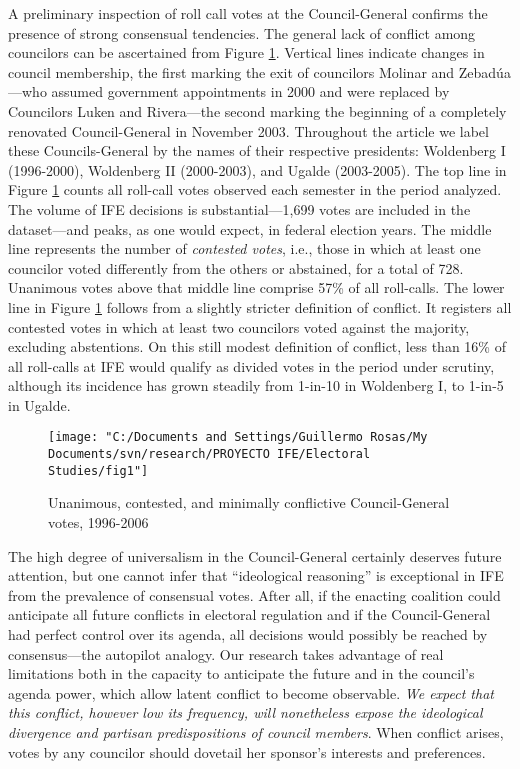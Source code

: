 \documentclass[12 pt, letter]{article}
\begin{document}
A preliminary inspection of roll call votes at the Council-General
confirms the presence of strong consensual tendencies.  The general
lack of conflict among councilors can be ascertained from Figure
\ref{F:unan}.  Vertical lines indicate changes in council
membership, the first marking the exit of councilors Molinar and
Zebad\'ua---who assumed government appointments in 2000 and were
replaced by Councilors Luken and Rivera---the second marking the
beginning of a completely renovated Council-General in November
2003.  Throughout the article we label these Councils-General by the
names of their respective presidents: Woldenberg I (1996-2000),
Woldenberg II (2000-2003), and Ugalde (2003-2005).  The top line in
Figure \ref{F:unan} counts all roll-call votes observed each
semester in the period analyzed.  The volume of IFE decisions is
substantial---1,699 votes are included in the dataset---and peaks,
as one would expect, in federal election years.  The middle line
represents the number of \emph{contested votes}, i.e., those in
which at least one councilor voted differently from the others or
abstained, for a total of 728.  Unanimous votes above that middle
line comprise 57\% of all roll-calls. The lower line in Figure
\ref{F:unan} follows from a slightly stricter definition of
conflict.  It registers all contested votes in which at least two
councilors voted against the majority, excluding abstentions.  On
this still modest definition of conflict, less than 16\% of all
roll-calls at IFE would qualify as divided votes in the period under
scrutiny, although its incidence has grown steadily from 1-in-10 in
Woldenberg I, to 1-in-5 in Ugalde.

\begin{figure}
\begin{center}
\texttt{[image: "C:/Documents and Settings/Guillermo Rosas/My Documents/svn/research/PROYECTO IFE/Electoral Studies/fig1"]}
\caption{Unanimous, contested, and minimally conflictive
Council-General votes, 1996-2006}\label{F:unan}
\end{center}
\end{figure}

The high degree of universalism in the Council-General certainly
deserves future attention, but one cannot infer that ``ideological
reasoning'' is exceptional in IFE from the prevalence of consensual
votes.  After all, if the enacting coalition could anticipate all
future conflicts in electoral regulation and if the Council-General
had perfect control over its agenda, all decisions would possibly be
reached by consensus---the autopilot analogy.  Our research takes
advantage of real limitations both in the capacity to anticipate the
future and in the council's agenda power, which allow latent
conflict to become observable.  \emph{We expect that this conflict,
however low its frequency, will nonetheless expose the ideological
divergence and partisan predispositions of council members}.  When
conflict arises, votes by any councilor should dovetail her
sponsor's interests and preferences.
\end{document}
